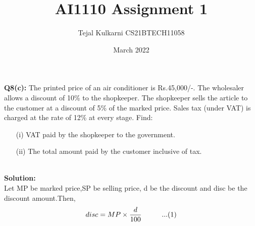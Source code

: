 \documentclass[12pt, twocolumn]{article}
\title{AI1110 Assignment 1}
\author{Tejal Kulkarni CS21BTECH11058}
\date{March 2022}
\begin{document}
\maketitle

\textbf{Q8(c):} The printed price of an air conditioner is  Rs.45,000/-. The wholesaler allows a discount of 10\% to the shopkeeper. The shopkeeper sells the article to the customer at a discount of 5\% of the marked price. Sales tax (under VAT) is charged at the rate of 12\% at every stage. Find:
\begin{enumerate}
\item[(i)]VAT paid by the shopkeeper to the government.
\item[(ii)]The total amount paid by the customer inclusive of tax.\\ \\
\end{enumerate}
\textbf{Solution:}\\
Let MP be marked price,SP be selling price, d be the discount and disc be the discount amount.Then, \\
\begin{equation*}
 disc = MP\times\frac{d}{100} \hspace{1cm}...(1)\\ 
\end{equation*}
\end{document}
